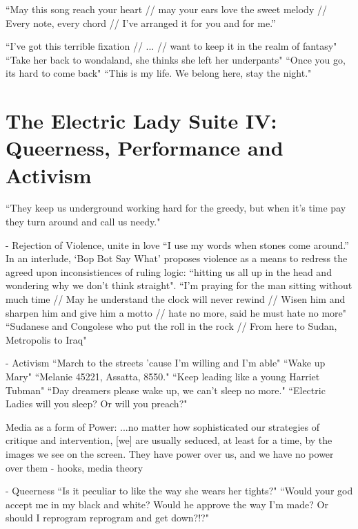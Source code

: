\documentclass[a4paper, 11pt]{article} %
\begin{document}
``May this song reach your heart // may your ears love the sweet melody // Every note, every chord // I've arranged it for you and for me.''\cite{neonvalleystreet}

``I've got this terrible fixation // ... // want to keep it in the realm of fantasy"\cite{makethebus}
``Take her back to wondaland, she thinks she left her underpants"\cite{wondaland}
``Once you go, its hard to come back"\cite{wondaland}
``This is my life. We belong here, stay the night."\cite{wondaland}


\section*{The Electric Lady Suite IV: Queerness, Performance and Activism}

``They keep us underground working hard for the greedy, but when it's time pay they turn around and call us needy."\cite{queen}

- Rejection of Violence, unite in love
``I use my words when stones come around.''\cite{manymoons}
In an interlude, `Bop Bot Say What' proposes violence as a means to redress the agreed upon inconsistiences of ruling logic: ``hitting us all up in the head and wondering why we don't think straight"\cite{chromeshoppe}.
``I'm praying for the man sitting without much time // May he understand the clock will never rewind // Wisen him and sharpen him and give him a motto // hate no more, said he must hate no more"\cite{danceordie}
``Sudanese and Congolese who put the roll in the rock // From here to Sudan, Metropolis to Iraq"\cite{danceordie}

- Activism
``March to the streets 'cause I'm willing and I'm able"\cite{queen}
``Wake up Mary"\cite{sallyride}
``Melanie 45221, Assatta, 8550."\cite{chromeshoppe}
``Keep leading like a young Harriet Tubman"\cite{queen}
``Day dreamers please wake up, we can't sleep no more."\cite{sincerelyjane}
``Electric Ladies will you sleep? Or will you preach?"\cite{queen}

Media as a form of Power:
...no matter how sophisticated our strategies of critique and intervention, [we] are usually seduced, at least for a time, by the images we see on the screen. They have power over us, and we have no power over them - hooks, media theory

- Queerness
``Is it peculiar to like the way she wears her tights?"\cite{queen}
``Would your god accept me in my black and white? Would he approve the way I'm made? Or should I reprogram reprogram and get down?!?"\cite{queen}
\end{document}
